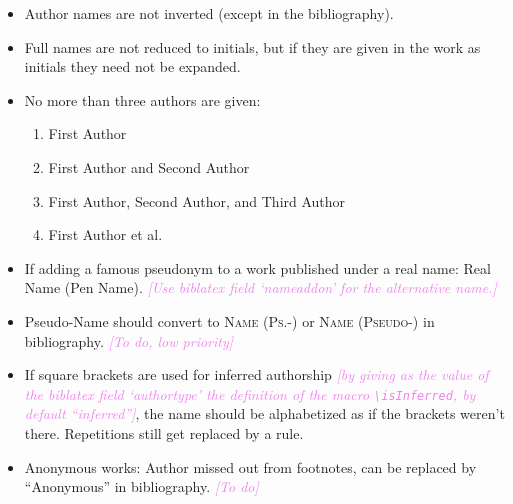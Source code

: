 \documentclass[extrafontsizes,11pt,a4paper,oneside]{memoir}
\newcommand*{\code}[1]{`\textsf{#1}'}
\newcommand*{\aside}[1]{\textcolor{violet}{\emph{[#1]}}}
\begin{document}
\begin{itemize}
  \item Author names are not inverted (except in the bibliography).
  
  \item Full names are not reduced to initials, but if they are given in the work as initials they need not be expanded.
  
  \item No more than three authors are given:
  \begin{enumerate}
    \item First Author
    \\
    
    \item First Author and Second Author
    \\
    
    \item First Author, Second Author, and Third Author
    \\
    
    \item First Author et al.
    \\ %
  \end{enumerate}
  
  \item If adding a famous pseudonym to a work published under a real name: Real Name (Pen Name). \aside{Use \textsf{biblatex} field \code{nameaddon} for the alternative name.}\\
  
  \item Pseudo-Name should convert to \textsc{Name (Ps.-)} or \textsc{Name (Pseudo-)} in bibliography. \aside{To do, low priority}
  
  \item If square brackets are used for inferred authorship \aside{by giving as the value of the \textsf{biblatex} field \code{authortype} the definition of the macro \texttt{\textbackslash isInferred}, by default \enquote{inferred}}, the name should be alphabetized as if the brackets weren't there. Repetitions still get replaced by a rule.\\
  
  \item Anonymous works: Author missed out from footnotes, can be replaced by \enquote{Anonymous} in bibliography. \aside{To do}
  \\
  \\
\end{itemize}
\end{document}
